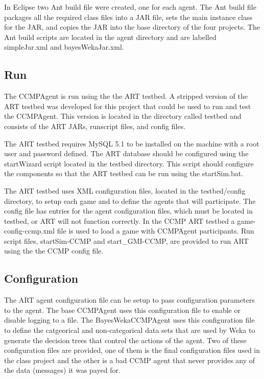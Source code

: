 In Eclipse two Ant build file were created, one for each agent.  The Ant build
file packages all the required class files into a JAR file, sets the main
instance class for the JAR, and copies the JAR into the base directory of the
four projects.  The Ant build scripts are located in the agent directory and
are labelled simpleJar.xml and bayesWekaJar.xml.

\subsection{Run}
The CCMPAgent is run using the the ART testbed.  A stripped version of the
ART testbed was developed for this project that could be used to run and test
the CCMPAgent.  This version is located in the directory called testbed and
consists of the ART JARs, runscript files, and config files.  

The ART testbed requires MySQL 5.1 to be installed on the machine with a root
user and password defined.  The ART database should be configured using the
startWizard script located in the testbed directory.  This script should
configure the components so that the ART testbed can be run using the
startSim.bat.

The ART testbed uses XML configuration files, located in the testbed/config
directory, to setup each game and to define the agents that will participate. 
The config file has entries for the agent configuration files, which must be
located in testbed\src\testbed\participants, or ART will not function
correctly.  In the CCMP ART testbed a game-config-ccmp.xml file is used to load
a game with CCMPAgent participants.  Run script files, startSim-CCMP and
start_GMI-CCMP, are provided to run ART using the the CCMP config file.

\subsection{Configuration}
The ART agent configuration file can be setup to pass configuration parameters
to the agent.  The base CCMPAgent uses this configuration file to enable or
disable logging to a file.  The BayesWekaCCMPAgent uses this configuration file
to define the catgeorical and non-categorical data sets that are used by Weka
to generate the decision trees that control the actions of the agent.  Two of
these configuration files are provided, one of them is the final configuration
files used in the class project and the other is a bad CCMP agent that never
provides any of the data (messages) it was payed for.

